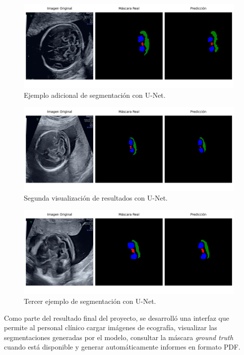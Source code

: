 \begin{figure}[h]
    \centering
    \includegraphics[width=1\textwidth]{img/image2_unet.png}
    \caption{Ejemplo adicional de segmentación con U-Net.}
    \label{fig:comparacion_unet2}
\end{figure}

\begin{figure}[h]
    \centering
    \includegraphics[width=1\textwidth]{img/image3_unet.png}
    \caption{Segunda visualización de resultados con U-Net.}
    \label{fig:comparacion_unet3}
\end{figure}

\begin{figure}[h]
    \centering
    \includegraphics[width=1\textwidth]{img/image4_unet.png}
    \caption{Tercer ejemplo de segmentación con U-Net.}
    \label{fig:comparacion_unet4}
\end{figure}

Como parte del resultado final del proyecto, se desarrolló una interfaz que permite al personal clínico cargar imágenes de ecografía, visualizar las segmentaciones generadas por el modelo, consultar la máscara \textit{ground truth} cuando está disponible y generar automáticamente informes en formato PDF.

